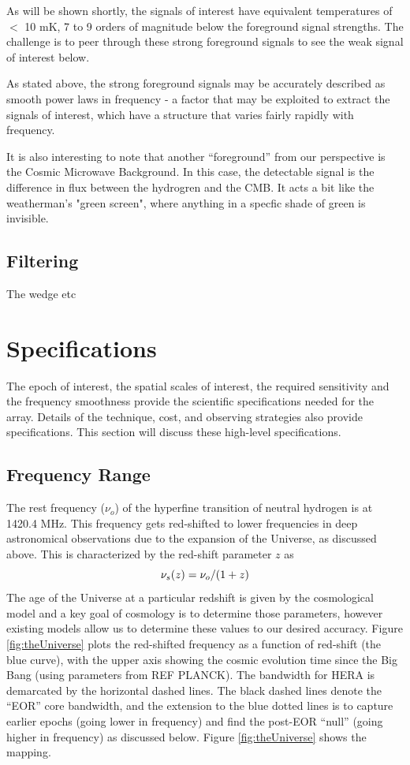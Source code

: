 \documentclass[ars]{/Users/daviddeboer1/Documents/Papers/Copernicus_LaTeX_Package_v_2_7/copernicus}
\begin{document}
As will be shown shortly, the signals of interest have equivalent temperatures of $<$ 10 mK, 7 to 9 
orders of magnitude below the foreground signal strengths.  The challenge is to peer through these
strong foreground signals to see the weak signal of interest below.

As stated above, the strong foreground signals may be accurately described as smooth power laws in 
frequency - a factor that may be exploited to extract the signals of interest, which have a structure
that varies fairly rapidly with frequency.

It is also interesting to note that another ``foreground'' from our perspective is the Cosmic Microwave Background.  
In this case, the detectable signal is the difference in flux between the hydrogren and the CMB.  It acts a bit like the
weatherman's "green screen", where anything in a specfic shade of green is invisible.

\subsection{Filtering}
The wedge etc

\section{Specifications}
\label{sec:spec}
The epoch of interest, the spatial scales of interest, the required sensitivity and
the frequency smoothness provide the scientific specifications needed for the array.
Details of the technique, cost, and observing strategies also provide specifications.
This section will discuss these high-level specifications.

\subsection{Frequency Range}
The rest frequency ($\nu_o$) of the hyperfine transition of neutral hydrogen is at
1420.4 MHz. This frequency gets red-shifted to lower frequencies in deep astronomical
observations due to the expansion of the Universe, as discussed above. This is
characterized by the red-shift parameter $z$ as
\begin{equation}
\centering
\label{eq:redshift}
\nu_s(z) = \nu_o/(1+z)
\end{equation}
The age of the Universe at a particular redshift is given by the cosmological model
and a key goal of cosmology is to determine those parameters, however existing models
allow us to determine these values to our desired accuracy. Figure
\ref{fig:theUniverse} plots the red-shifted frequency as a function of red-shift (the
blue curve), with the upper axis showing the cosmic evolution time since the Big Bang
(using parameters from REF PLANCK). The bandwidth for HERA is demarcated by the
horizontal dashed lines. The black dashed lines denote the ``EOR'' core bandwidth,
and the extension to the blue dotted lines is to capture earlier epochs (going lower
in frequency) and find the post-EOR ``null'' (going higher in frequency) as discussed
below. Figure \ref{fig:theUniverse} shows the mapping.
\end{document}

